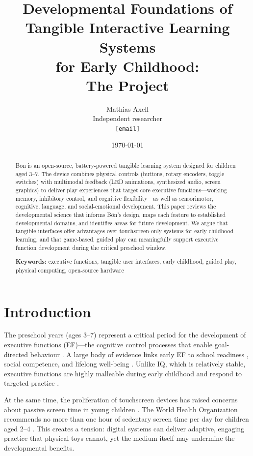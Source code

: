 \documentclass[12pt, a4paper]{article}
\title{Developmental Foundations of Tangible Interactive Learning Systems\\
       for Early Childhood:\\
       \large The \Bodn{} Project}
\author{
  Mathias Axell\\
  {\small Independent researcher}\\
  {\small \texttt{[email]}}
}
\date{\today}
\newcommand{\Bodn}{B\"o\dh{}n}
\begin{document}
\maketitle

\begin{abstract}
\Bodn{} is an open-source, battery-powered tangible learning system designed for
children aged 3--7. The device combines physical controls (buttons, rotary
encoders, toggle switches) with multimodal feedback (LED animations, synthesized
audio, screen graphics) to deliver play experiences that target core executive
functions---working memory, inhibitory control, and cognitive flexibility---as
well as sensorimotor, cognitive, language, and social-emotional development.
This paper reviews the developmental science that informs \Bodn{}'s design,
maps each feature to established developmental domains, and identifies areas
for future development. We argue that tangible interfaces offer advantages over
touchscreen-only systems for early childhood learning, and that game-based,
guided play can meaningfully support executive function development during the
critical preschool window.

\medskip
\noindent\textbf{Keywords:} executive functions, tangible user interfaces,
early childhood, guided play, physical computing, open-source hardware
\end{abstract}

\tableofcontents
\newpage

\section{Introduction}
\label{sec:introduction}

The preschool years (ages 3--7) represent a critical period for the development
of executive functions (EF)---the cognitive control processes that enable
goal-directed behaviour \citep{diamond2013executive}. A large body of evidence
links early EF to school readiness \citep{blair2007relating}, social competence,
and lifelong well-being \citep{moffitt2011gradient}. Unlike IQ, which is
relatively stable, executive functions are highly malleable during early
childhood and respond to targeted practice
\citep{diamond2013executive, montroy2016development}.

At the same time, the proliferation of touchscreen devices has raised concerns
about passive screen time in young children \citep{radesky2015mobile}. The
World Health Organization recommends no more than one hour of sedentary screen
time per day for children aged 2--4 \citep{who2019guidelines}. This creates a
tension: digital systems can deliver adaptive, engaging practice that physical
toys cannot, yet the medium itself may undermine the developmental benefits.
\end{document}
